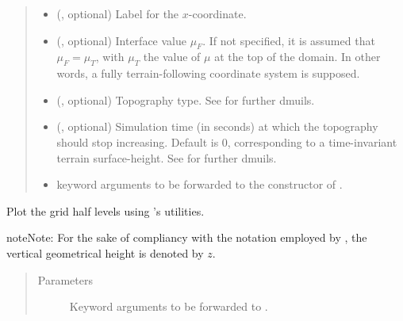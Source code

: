 \documentclass[letterpaper,10pt,english]{sphinxmanual}
\begin{document}
\begin{fulllineitems}
\begin{fulllineitems}
\begin{quote}
\begin{description}
\begin{itemize}
\item {} 
 (, optional) \textendash{} Label for the \(x\)-coordinate.

\item {} 
 (, optional) \textendash{} Interface value \(\mu_F\). If not specified,
it is assumed that \(\mu_F = \mu_T\), with \(\mu_T\) the value of
\(\mu\) at the top of the domain. In other words, a fully terrain-following
coordinate system is supposed.

\item {} 
 (, optional) \textendash{} Topography type. See {\hyperref[\detokenize{api:module-grids.topography}]{}}
for further dmuils.

\item {} 
 (, optional) \textendash{} Simulation time (in seconds) at which the topography
should stop increasing. Default is 0, corresponding to a time-invariant terrain
surface-height. See  for further dmuils.

\item {} 
 \textendash{} keyword arguments to be forwarded to the constructor of
{\hyperref[\detokenize{api:grids.topography.Topography1d}]{}}.

\end{itemize}

\end{description}\end{quote}

\end{fulllineitems}


\begin{fulllineitems}
\label{\detokenize{api:grids.gal_chen.GalChen2d.plot}}
Plot the grid half levels using ’s utilities.

\begin{sphinxadmonition}{note}{Note:}
For the sake of compliancy with the notation employed by ,
the vertical geometrical height is denoted by \(z\).
\end{sphinxadmonition}
\begin{quote}\begin{description}
\item[{Parameters}] \leavevmode
{} \textendash{} Keyword arguments to be forwarded to .


\end{description}
\end{quote}
\end{fulllineitems}
\end{fulllineitems}
\end{document}
